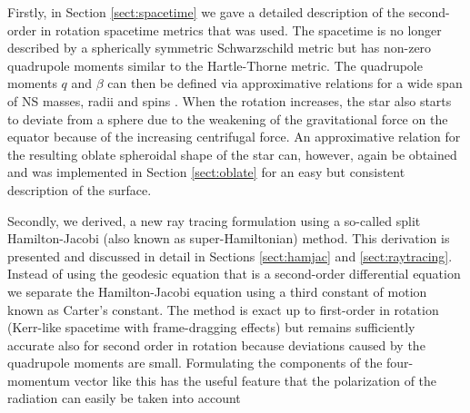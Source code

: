 \documentclass{aa}
\newcommand{\sch}{Schwarzschild }
\begin{document}
Firstly, in Section \ref{sect:spacetime} we gave a detailed description of the second-order in rotation spacetime metrics that was used.
The spacetime is no longer described by a spherically symmetric \sch metric but has non-zero quadrupole moments similar to the Hartle-Thorne metric.
The quadrupole moments $q$ and $\beta$ can then be defined via approximative relations for a wide span of NS masses, radii and spins \citep{aGM14}.
When the rotation increases, the star also starts to deviate from a sphere due to the weakening of the gravitational force on the equator because of the increasing centrifugal force.
An approximative relation for the resulting oblate spheroidal shape of the star can, however, again be obtained \citep{MLC07, aGM14} and was implemented in Section \ref{sect:oblate} for an easy but consistent description of the surface.

Secondly, we derived, a new ray tracing formulation using a so-called split Hamilton-Jacobi (also known as super-Hamiltonian) method.
This derivation is presented and discussed in detail in Sections \ref{sect:hamjac} and \ref{sect:raytracing}.
Instead of using the geodesic equation that is a second-order differential equation we separate the Hamilton-Jacobi equation using a third constant of motion known as Carter's constant.
The method is exact up to first-order in rotation (Kerr-like spacetime with frame-dragging effects) but remains sufficiently accurate also for second order in rotation because deviations caused by the quadrupole moments are small.
Formulating the components of the four-momentum vector like this has the useful feature that the polarization of the radiation can easily be taken into account \citep[see e.g.][]{cha, dexter2016}
\end{document}
